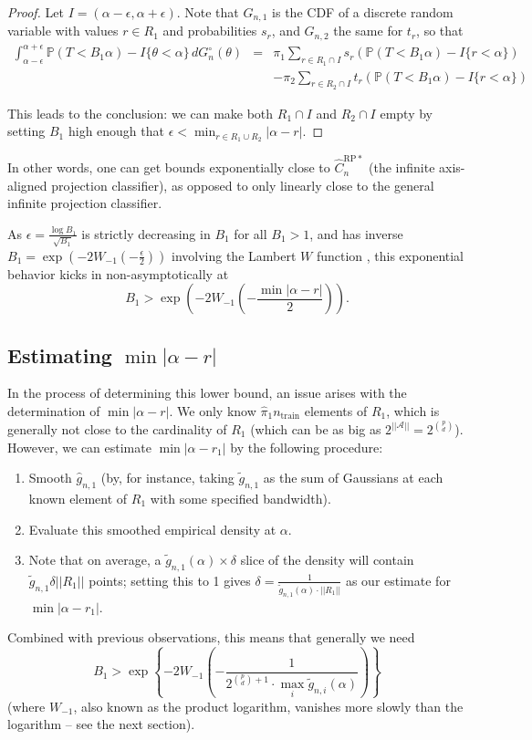 \documentclass[ejs,preprint]{imsart}
\newcommand\crpnhatstar{\hat{C}_{n}^{\mathrm{RP*}}}
\begin{document}
\begin{proof}
Let $I=(\alpha-\epsilon,\alpha+\epsilon)$. Note that $G_{n,1}$ is
the CDF of a discrete random variable with values $r\in R_{1}$ and
probabilities $s_{r}$, and $G_{n,2}$ the same for $t_r$, so that 
\begin{eqnarray*}
\int_{\alpha-\epsilon}^{\alpha+\epsilon}\!\mathbb{P}(T<B_{1}\alpha)-I\{\theta<\alpha\}\,dG_{n}^{\circ}(\theta) & = & \pi_{1}\sum_{r\in R_{1}\cap I}s_{r}\left(\mathbb{P}(T<B_{1}\alpha)-I\{r<\alpha\}\right)\\
 &  & -\pi_{2}\sum_{r\in R_{2}\cap I}t_{r}\left(\mathbb{P}(T<B_{1}\alpha)-I\{r<\alpha\}\right)
\end{eqnarray*}


This leads to the conclusion: we can make both $R_{1}\cap I$
and $R_{2}\cap I$ empty by setting $B_{1}$ high enough that $\epsilon<\min_{r\in R_{1}\cup R_{2}}|\alpha-r|$.
\end{proof}

In other words, one can get bounds exponentially close to $\crpnhatstar$
(the infinite axis-aligned projection classifier), as opposed to only
linearly close to the general infinite projection classifier.

As $\epsilon=\frac{\log B_{1}}{\sqrt{B_{1}}}$ is strictly decreasing in $B_{1}$ for all $B_{1}>1$, and has inverse $B_{1}=\exp\left(-2W_{-1}(-\frac{\epsilon}{2})\right)$ involving the Lambert $W$ function \cite{CGHJK96}, this exponential behavior kicks in non-asymptotically at
\[
B_{1}>\exp\left(-2W_{-1}\left(-\frac{\min|\alpha-r|}{2}\right)\right).
\]

\subsection{Estimating $\min|\alpha-r|$}

In the process of determining this lower bound, an issue arises with the determination of $\min|\alpha-r|$.
We only know $\hat{\pi}_{1}n_{\mathrm{train}}$ elements of $R_{1}$, which is generally not close to the cardinality of $R_{1}$ (which can be as big as $2^{||\mathcal{A}||}=2^{\binom{p}{d}}$).
However, we can estimate $\min|\alpha-r_{1}|$ by the following procedure:
\begin{enumerate}
\item Smooth $\hat{g}_{n,1}$ (by, for instance, taking $\tilde{g}_{n,1}$
as the sum of Gaussians at each known element of $R_{1}$ with some
specified bandwidth).
\item Evaluate this smoothed empirical density at $\alpha$.
\item Note that on average, a $\tilde{g}_{n,1}(\alpha)\times\delta$ slice
of the density will contain $\tilde{g}_{n,1}\delta||R_{1}||$ points;
setting this to 1 gives $\delta=\frac{1}{\tilde{g}_{n,1}(\alpha)\cdot||R_{1}||}$
as our estimate for $\min|\alpha-r_{1}|$.
\end{enumerate}
Combined with previous observations, this means that generally we
need 
\[
B_{1}>\exp\left\{ -2W_{-1}\left(-\frac{1}{2^{\binom{p}{d}+1}\cdot\max_i\tilde{g}_{n,i}(\alpha)}\right)\right\} 
\]
 (where $W_{-1}$, also known as the product logarithm, vanishes
more slowly than the logarithm -- see the next section).
\end{document}
